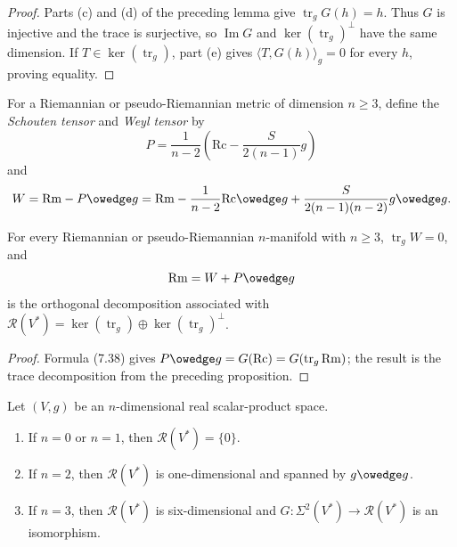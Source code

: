 \begin{proof}
\sketch
Parts (c) and (d) of the preceding lemma give
$\operatorname{tr}_gG(h)=h$.  Thus $G$ is injective and the trace is
surjective, so $\operatorname{Im}G$ and
$\ker(\operatorname{tr}_g)^\perp$ have the same dimension.  If
$T\in\ker(\operatorname{tr}_g)$, part (e) gives
$\langle T,G(h)\rangle_g=0$ for every $h$, proving equality.
\end{proof}

For a Riemannian or pseudo-Riemannian metric of dimension $n\geq3$, define
the \emph{Schouten tensor} and \emph{Weyl tensor} by
\[
P=\frac1{n-2}\left(\mathrm{Rc}-\frac{S}{2(n-1)}g\right)
\]
and
\[
W=\mathrm{Rm}-P\owedge g
=\mathrm{Rm}-\frac1{n-2}\mathrm{Rc}\owedge g
+\frac{S}{2(n-1)(n-2)}g\owedge g.
\]

\begin{proposition}
\label{prop:weyl-decomposition}

For every Riemannian or pseudo-Riemannian $n$-manifold with $n\geq3$,
$\operatorname{tr}_gW=0$, and
\[
\mathrm{Rm}=W+P\owedge g
\]
is the orthogonal decomposition associated with
$\mathscr R(V^*)=\ker(\operatorname{tr}_g)
\oplus\ker(\operatorname{tr}_g)^\perp$.
\end{proposition}

\begin{proof}
\sketch
Formula (7.38) gives
$P\owedge g=G(\mathrm{Rc})=G(\operatorname{tr}_g\mathrm{Rm})$; the result is
the trace decomposition from the preceding proposition.
\end{proof}

\begin{corollary}
\label{cor:curvature-space-dimensions}

Let $(V,g)$ be an $n$-dimensional real scalar-product space.
\begin{enumerate}
\item[(a)] If $n=0$ or $n=1$, then $\mathscr R(V^*)=\{0\}$.
\item[(b)] If $n=2$, then $\mathscr R(V^*)$ is one-dimensional and spanned by
$g\owedge g$.
\item[(c)] If $n=3$, then $\mathscr R(V^*)$ is six-dimensional and
$G:\Sigma^2(V^*)\to\mathscr R(V^*)$ is an isomorphism.
\end{enumerate}
\end{corollary}

